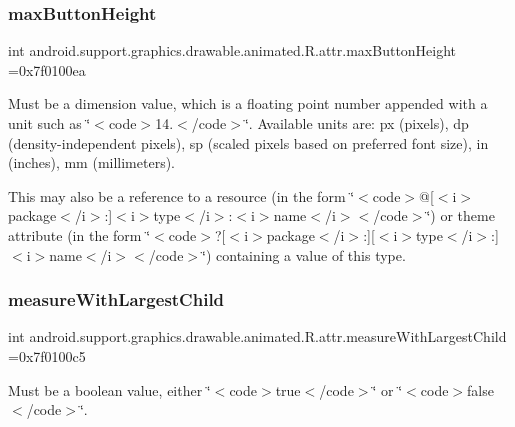 \subsubsection{\texorpdfstring{max\+Button\+Height}{maxButtonHeight}}
{\footnotesize\ttfamily int android.\+support.\+graphics.\+drawable.\+animated.\+R.\+attr.\+max\+Button\+Height =0x7f0100ea\hspace{0.3cm}{\ttfamily [static]}}

Must be a dimension value, which is a floating point number appended with a unit such as \char`\"{}$<$code$>$14.\+5sp$<$/code$>$\char`\"{}. Available units are\+: px (pixels), dp (density-\/independent pixels), sp (scaled pixels based on preferred font size), in (inches), mm (millimeters). 

This may also be a reference to a resource (in the form \char`\"{}$<$code$>$@\mbox{[}$<$i$>$package$<$/i$>$\+:\mbox{]}$<$i$>$type$<$/i$>$\+:$<$i$>$name$<$/i$>$$<$/code$>$\char`\"{}) or theme attribute (in the form \char`\"{}$<$code$>$?\mbox{[}$<$i$>$package$<$/i$>$\+:\mbox{]}\mbox{[}$<$i$>$type$<$/i$>$\+:\mbox{]}$<$i$>$name$<$/i$>$$<$/code$>$\char`\"{}) containing a value of this type. \mbox{\label{classandroid_1_1support_1_1graphics_1_1drawable_1_1animated_1_1R_1_1attr_ae640187a6424aea5179356e440b7b871}} 
\subsubsection{\texorpdfstring{measure\+With\+Largest\+Child}{measureWithLargestChild}}
{\footnotesize\ttfamily int android.\+support.\+graphics.\+drawable.\+animated.\+R.\+attr.\+measure\+With\+Largest\+Child =0x7f0100c5\hspace{0.3cm}{\ttfamily [static]}}

Must be a boolean value, either \char`\"{}$<$code$>$true$<$/code$>$\char`\"{} or \char`\"{}$<$code$>$false$<$/code$>$\char`\"{}. 

